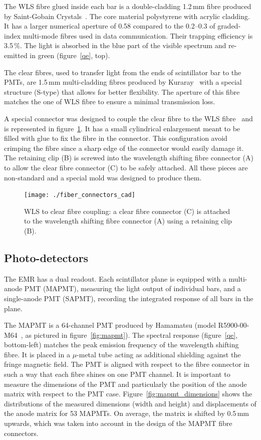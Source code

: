 \documentclass[a4paper,11pt]{article}
\begin{document}
The WLS fibre glued inside each bar is a double-cladding 1.2\,mm fibre produced by Saint-Gobain Crystals~\cite{saintgobain}.
The core material polystyrene with acrylic cladding. It has a larger numerical aperture of 0.58 compared to the 0.2--0.3
of graded-index multi-mode fibres used in data communication. Their trapping efficiency is 3.5\,\%. The light is absorbed in the blue part of
the visible spectrum and re-emitted in green (figure~\ref{qe}, top). 

The clear fibres, used to transfer light from the ends of scintillator bar to the PMTs, are 1.5\,mm multi-cladding fibres produced by 
Kuraray~\cite{kuraray} with a special structure (S-type) that allows for better flexibility. The aperture of this fibre matches
the one of WLS fibre to ensure a minimal transmission loss.

A special connector was designed to couple the clear fibre to the WLS fibre~\cite{emr_design_change} and is represented in 
figure~\ref{fig:fibre_connectors_cad}. It has a small cylindrical enlargement meant to be filled with glue to fix the fibre in the connector.
This configuration avoid crimping the fibre since a sharp edge of the connector would easily damage it. The retaining clip (B) is screwed into
the wavelength shifting fibre connector (A) to allow the clear fibre connector (C) to be safely attached. All these pieces are non-standard and
a special mold was designed to produce them. 

\begin{figure}[htp!]
 \centering
 \texttt{[image: ./fiber\_connectors\_cad]}
 \caption[Clear fibre connector]{WLS to clear fibre coupling: a clear fibre connector (C) is attached to the wavelength shifting fibre connector
 (A) using a retaining clip (B).}
 \label{fig:fibre_connectors_cad}
\end{figure}

\subsection{Photo-detectors}
The EMR has a dual readout. Each scintillator plane is equipped with a multi-anode PMT (MAPMT), measuring
the light output of individual bars, and a single-anode PMT (SAPMT), recording the integrated response of all bars in the plane. 

The MAPMT is a 64-channel PMT produced by Hamamatsu (model R5900-00-M64~\cite{hamamatsu_mapmt}, as pictured in figure~\ref{fig:mapmt}). The spectral
response (figure~\ref{qe}, bottom-left) matches the peak emission frequency of the wavelength shifting fibre. It is placed in a $\mu$-metal tube acting
as additional shielding against the fringe magnetic field. The PMT is aligned with respect to the fibre connector in such a way that each fibre shines
on one PMT channel. It is important to measure the dimensions of the PMT and particularly the position of the anode matrix with respect to the
PMT case. Figure~\ref{fig:mapmt_dimensions} shows the distributions of the measured dimensions (width and height) and displacements of the anode
matrix for 53 MAPMTs. On average, the matrix is shifted by 0.5\,mm upwards, which was taken into account in the design of the MAPMT fibre connectors.
\end{document}

